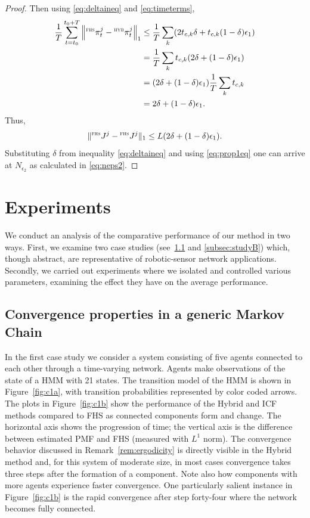 \documentclass[journal]{IEEEtran}
\theoremstyle{remark}
\newcommand{\suf}[1]{\textsc{\tiny #1}}  %
\theoremstyle{definition}
\begin{document}
\begin{proof}
Then using \eqref{eq:deltaineq} and  \eqref{eq:timeterms},
\begin{align}
\frac{1}{T}\sum_{t=t_0}^{t_0+T}\left\| {}^\suf{FHS}\pi_{t}^{j} - {}^\suf{HYB}\pi_{t}^{j}\right\|_1 &\le
\frac{1}{T}\sum_{k} (2t_{c,k} \delta + t_{c, k} (1-\delta)\epsilon_1) \nonumber \\
& = \frac{1}{T}\sum_{k} t_{c, k} (2\delta + (1-\delta)\epsilon_1) \nonumber \\
& = (2\delta + (1- \delta)\epsilon_1) \frac{1}{T}\sum_{k} t_{c, k} \nonumber \\
& = 2\delta + (1- \delta)\epsilon_1.
\end{align}	
Thus, 
\begin{equation}
\|{}^\suf{FHS}J^{j} - {}^\suf{FHS}J^{j}\|_1 \le L(2\delta + (1-\delta) \epsilon_1).
\end{equation}
Substituting $\delta$ from inequality \eqref{eq:deltaineq} and using \eqref{eq:prop1eq} one can arrive at $N_{\epsilon_2}$ as calculated in  \eqref{eq:neps2}. \end{proof}	



\section{Experiments} \label{sec:experiments}

We conduct an analysis of the comparative performance of our method in two
ways.  First, we examine two case studies (see~\ref{subsec:studyA} and
\ref{subsec:studyB}) which, though abstract, are  representative of
robotic-sensor network applications.  Secondly, we carried out experiments
where we isolated and controlled various parameters, examining the effect they
have on the average performance. 


\subsection{Convergence properties in a generic Markov Chain} \label{subsec:studyA}

In the first case study we consider a system consisting of five agents
connected to each other through a time-varying network. Agents make
observations of the state of a HMM with 21 states.  The transition model of the
HMM is shown in Figure~\ref{fig:c1a}, with transition probabilities represented
by color coded arrows.  The plots in Figure~\ref{fig:c1b} show the performance
of the Hybrid and ICF methods compared to FHS as connected components form and change. The horizontal axis shows the
progression of time;
the vertical axis is the difference between estimated PMF and FHS (measured
with $L^1$ norm). 
The convergence behavior discussed in Remark~\ref{rem:ergodicity} is 
directly visible in the Hybrid method and,
for this system of moderate size, in most cases
convergence takes three steps after the
formation of a component. 
Note also how components with more agents experience faster
convergence.
One particularly salient instance in Figure~\ref{fig:c1b} is the rapid
convergence after step forty-four where the network becomes fully connected.
\end{document}

